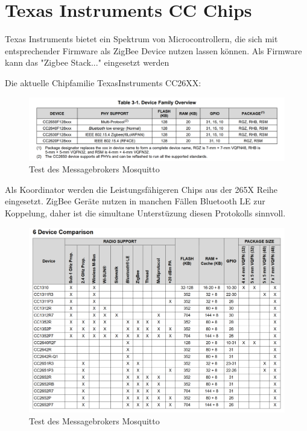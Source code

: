 \section{Texas Instruments CC Chips}

Texas Instruments bietet ein Spektrum von Microcontrollern, die sich mit entsprechender Firmware als ZigBee Device
nutzen lassen können. Als Firmware kann das "Zigbee Stack..." eingesetzt werden

Die aktuelle Chipfamilie TexasInstruments CC26XX:

\begin{figure}[H]
  \centering
  \includegraphics[width=1\textwidth]{media/table26xx.png}
  \caption{Test des Messagebrokers Mosquitto}
\end{figure}

Als Koordinator werden die Leistungsfähigeren Chips aus der 265X Reihe eingesetzt. ZigBee Geräte nutzen in manchen
Fällen Bluetooth LE zur Koppelung, daher ist die simultane Unterstüzung diesen Protokolls sinnvoll.

\begin{figure}[H]
  \centering
  \includegraphics[width=1\textwidth]{media/table265x.png}
  \caption{Test des Messagebrokers Mosquitto}
\end{figure}

